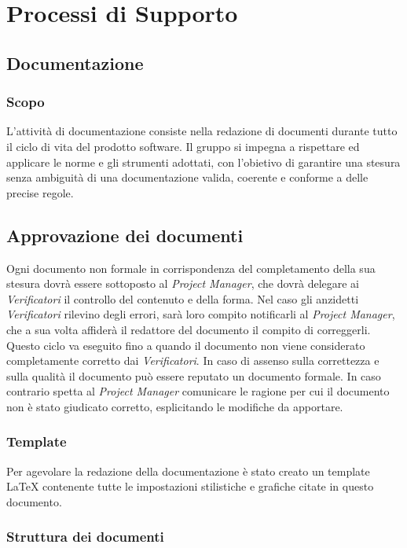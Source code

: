 \section{Processi di Supporto}


\subsection{Documentazione}
	
	\subsubsection{Scopo}
	L'attività di documentazione consiste nella redazione di documenti durante tutto il ciclo di vita del prodotto software. Il gruppo si impegna a rispettare ed applicare le norme e gli strumenti adottati, con l'obietivo di garantire una stesura senza ambiguità di una documentazione valida, coerente e conforme a delle precise regole.
	
	\subsection{Approvazione dei documenti}
	Ogni documento non formale in corrispondenza del completamento della sua stesura dovrà essere sottoposto al \textit{Project Manager}, che dovrà delegare ai \textit{Verificatori} il controllo del contenuto e della forma. Nel caso gli anzidetti \textit{Verificatori} rilevino degli errori, sarà loro compito notificarli al \textit{Project Manager}, che a sua volta affiderà il redattore del documento il compito di correggerli. Questo ciclo va eseguito fino a quando il documento non viene considerato completamente corretto dai  \textit{Verificatori}. In caso di assenso sulla correttezza e sulla qualità il documento può essere reputato un documento formale. In caso contrario spetta al \textit{Project Manager} comunicare le ragione per cui il documento non è stato giudicato corretto, esplicitando le modifiche da apportare.
		
	\subsubsection{Template}
	Per agevolare la redazione della documentazione è stato creato un template \LaTeX\text{ } contenente tutte le impostazioni stilistiche e grafiche citate in questo documento.
	
	\subsubsection{Struttura dei documenti}
	
